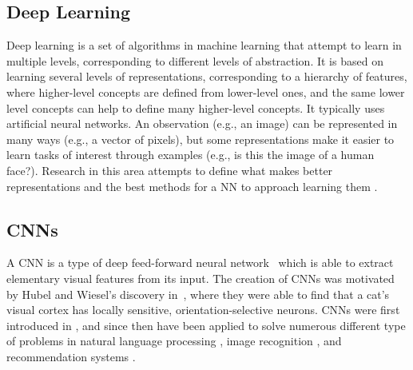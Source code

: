 
\subsection{Deep Learning}
Deep learning is a set of algorithms in machine learning that attempt to learn in multiple levels, corresponding to different levels of abstraction. It is based on learning several levels of representations, corresponding to a hierarchy of features, where higher-level concepts are defined from lower-level ones, and the same lower level concepts can help to define many higher-level concepts. It typically uses artificial neural networks. An observation (e.g., an image) can be represented in many ways (e.g., a vector of pixels), but some representations make it easier to learn tasks of interest through examples (e.g., is this the image of a human face?). Research in this area attempts to define what makes better representations and the best methods for a NN to approach learning them \cite{DeepLearning}.

\subsection{CNNs}

A CNN is a type of deep feed-forward neural network~\cite{cnn-star-galaxy} which is able to extract elementary visual features from its input. The creation of CNNs was motivated by Hubel and Wiesel's discovery in~\cite{hubel-wiesel-receptive-fields}, where they were able to find that a cat's visual cortex has locally sensitive, orientation-selective neurons. CNNs were first introduced in \citeyear{Lecun99objectrecognition} \cite{Lecun99objectrecognition}, and since then have been applied to solve numerous different type of problems in natural language processing \cite{Collobert:2008:UAN:1390156.1390177}, image recognition \cite{cnn-star-galaxy}, and recommendation systems \cite{NIPS2013_5004}.

